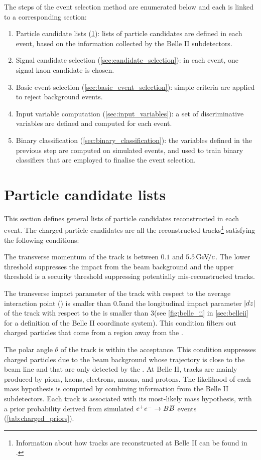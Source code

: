 The steps of the event selection method are enumerated below and each is linked to a corresponding section:
\begin{enumerate}
\item Particle candidate lists (\cref{sec:object_reconstruction}): lists of particle candidates are defined in each event, based on the information collected by the Belle II subdetectors.
\item Signal candidate selection (\cref{sec:candidate_selection}): in each event, one signal kaon candidate is chosen.
\item Basic event selection (\cref{sec:basic_event_selection}): simple criteria are applied to reject background events.
\item Input variable computation (\cref{sec:input_variables}): a set of discriminative variables are defined and computed for each event.
\item Binary classification (\cref{sec:binary_classification}): the variables defined in the previous step are computed on simulated events, and used to train binary classifiers that are employed to finalise the event selection.
\end{enumerate}
\section{Particle candidate lists} \label{sec:object_reconstruction}
This section defines general lists of particle candidates reconstructed in each event.
The charged particle candidates are all the reconstructed tracks\footnote{Information about how tracks are reconstructed at Belle II can be found in \cite{Bertacchi2021}.} satisfying the following conditions:
\bi
\item The transverse momentum \pt of the track is between $0.1$ and $5.5{\mathrm{\,Ge\kern -0.1em V\!/}c}$.
The lower threshold suppresses the impact from the beam background and the upper threshold is a security threshold suppressing potentially mis-reconstructed tracks.
\item The transverse impact parameter \dr of the track with respect to the average interaction point (\IP) is smaller than 0.5\cm and the longitudinal impact parameter $|dz|$ of the track with respect to the \IP is smaller than 3\cm (see \cref{fig:belle_ii} in \cref{sec:belleii} for a definition of the Belle II coordinate system). 
This condition filters out charged particles that come from a region away from the \IP.
\item The polar angle $\theta$ of the track is within the \CDC acceptance.
This condition suppresses charged particles due to the beam background whose trajectory is close to the beam line and that are only detected by the \VXD.
\ei
At Belle II, tracks are mainly produced by pions, kaons, electrons, muons, and protons.
The likelihood of each mass hypothesis is computed by combining \PID information from the Belle II subdetectors.
Each track is associated with its most-likely mass hypothesis, with a prior probability derived from simulated $e^+e^-\rightarrow B\kern 0.18em\overline{\kern -0.18em B}{}$ events (\cref{tab:charged_priors}).

